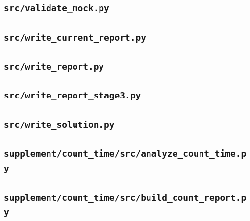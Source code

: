 \subsection*{\texttt{src/validate\_mock.py}}

\subsection*{\texttt{src/write\_current\_report.py}}

\subsection*{\texttt{src/write\_report.py}}

\subsection*{\texttt{src/write\_report\_stage3.py}}

\subsection*{\texttt{src/write\_solution.py}}

\subsection*{\texttt{supplement/count\_time/src/analyze\_count\_time.py}}

\subsection*{\texttt{supplement/count\_time/src/build\_count\_report.py}}

